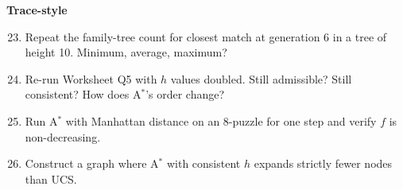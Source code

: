 \documentclass[11pt, a4paper]{article}
\begin{document}
\textbf{Trace-style}
\begin{enumerate}\setcounter{enumi}{22}
  \item Repeat the family-tree count for closest match at generation 6 in a tree of height 10. Minimum, average, maximum?
  \item Re-run Worksheet Q5 with $h$ values doubled. Still admissible? Still consistent? How does A$^{*}$'s order change?
  \item Run A$^{*}$ with Manhattan distance on an 8-puzzle for one step and verify $f$ is non-decreasing.
  \item Construct a graph where A$^{*}$ with consistent $h$ expands strictly fewer nodes than UCS.
\end{enumerate}
\end{document}
